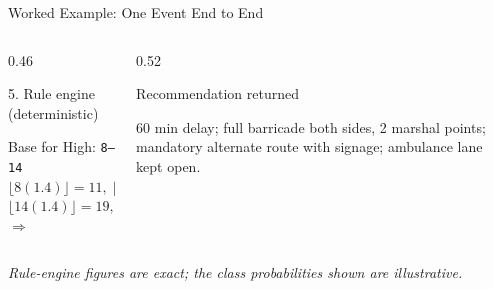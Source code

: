 \begin{frame}{Worked Example: One Event End to End}
  \vspace{3mm}
  \begin{columns}[T]
    \begin{column}{0.46\textwidth}
      \begin{exampleblock}{5. Rule engine (deterministic)}
        \begin{minipage}[t][14mm][t]{\linewidth}
          \small Base for High: \texttt{8--14}\\
          $\lfloor 8(1.4)\rfloor = 11,\ \lfloor 11(1.25)\rfloor = 13$\\
          $\lfloor 14(1.4)\rfloor = 19,\ \lfloor 19(1.25)\rfloor = 23$\\[1mm]
          $\Rightarrow$ {\large{}}
        \end{minipage}
      \end{exampleblock}
    \end{column}
    \begin{column}{0.52\textwidth}
      \begin{block}{Recommendation returned}
        \begin{minipage}[t][14mm][t]{\linewidth}
          \small 60 min delay; full barricade both sides, 2 marshal points;
          mandatory alternate route with signage; ambulance lane kept open.
        \end{minipage}
      \end{block}
    \end{column}
  \end{columns}

  \vspace{1mm}
  {\scriptsize\emph{Rule-engine figures are exact; the class probabilities shown
  are illustrative.}}
\end{frame}


